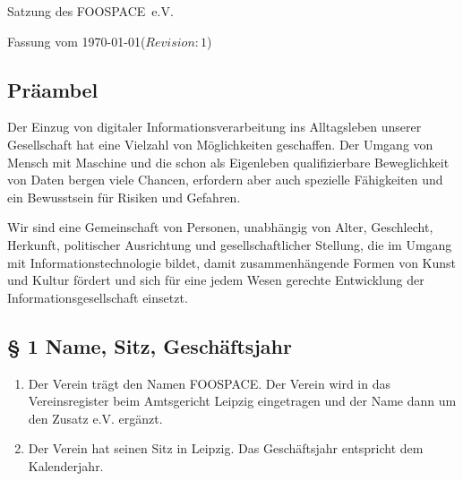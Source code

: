 \documentclass[10pt,a4paper]{scrartcl}
\newcommand{\qs}[1]{\glqq#1\grqq}
\newcommand{\name}{FOOSPACE}
\newcommand{\revision}{$Revision: 1 $}
\begin{document}
{\LARGE Satzung des \name\ e.V.}

Fassung vom \today (\revision)

\subsection*{Präambel}

Der Einzug von digitaler Informationsverarbeitung ins Alltagsleben
unserer Gesellschaft hat eine Vielzahl von Möglichkeiten geschaffen.
Der Umgang von Mensch mit Maschine und die schon als Eigenleben
qualifizierbare Beweglichkeit von Daten bergen viele Chancen,
erfordern aber auch spezielle Fähigkeiten und ein Bewusstsein für
Risiken und Gefahren.

Wir sind eine Gemeinschaft von Personen, unabhängig von Alter,
Geschlecht, Herkunft, politischer Ausrichtung und gesellschaftlicher
Stellung, die im Umgang mit Informationstechnologie bildet, damit
zusammenhängende Formen von Kunst und Kultur fördert und sich für
eine jedem Wesen gerechte Entwicklung der Informationsgesellschaft
einsetzt.

\subsection*{§ 1 Name, Sitz, Geschäftsjahr}
\begin{enumerate}
\item Der Verein trägt den Namen \qs{\name}. Der Verein wird in das
Vereinsregister beim Amtsgericht Leipzig eingetragen
und der Name dann um den Zusatz \qs{e.V.} ergänzt.
\item Der Verein hat seinen Sitz in Leipzig. Das Geschäftsjahr entspricht
dem Kalenderjahr.
\end{enumerate}
\end{document}
